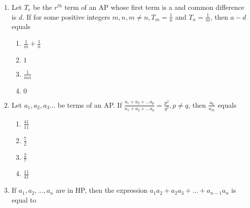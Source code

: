\begin{enumerate}    [label=\thesubsection.\arabic*, ref=\thesubsection.\theenumi]
\begin{multicols}{4}
\begin{enumerate}    
\item  {$\log_3 4$}
 \item {$1-\log_3 4$}
 \item {$1-\log_4 3$}
 \item {$\log_4 3$}
\end{enumerate}
\end{multicols}
%
\item {Let $T_r$ be the $r^{th}$ term of an AP whose first term is a and common difference is $d$. If for some positive integers $m, n,  m\neq n,  T_m = \frac{1}{n}$ and $T_n = \frac{1}{m}$,  then $a-d$ equals} 
{\hfill{}}
\begin{multicols}{4}
\begin{enumerate}    
\item  {$\frac{1}{m}+\frac{1}{n}$}
\item  {$1$}
\item  {$\frac{1}{mn}$}
\item  {$0$}
\end{enumerate}
\end{multicols}
\item Let $a_1,  a_2,  a_3 \dots$ be terms of an AP. If $\frac{a_1+a_2+\dots a_p}{a_1+a_2+\dots a_q}= \frac{p^2}{q^2},  p \neq q$,  then $\frac{a_6}{a_{21}}$ equals
\hfill {}
\begin{multicols}{4}
\begin{enumerate}    
\item  {$\frac{41}{11}$}
\item  {$\frac{7}{2}$}
\item  {$\frac{2}{7}$}
\item  {$\frac{11}{41}$}
\end{enumerate}
\end{multicols}
    \item If $a_1, a_2, \dots, a_n$ are in HP,  then the expression $a_1a_2+a_2a_3+\dots+a_{n-1}a_n$ is equal to


\end{enumerate}
